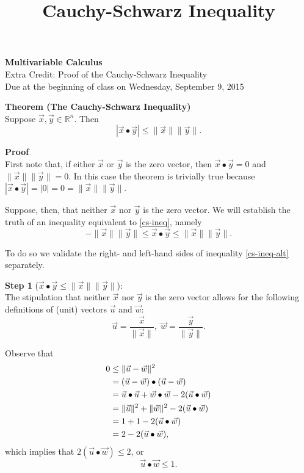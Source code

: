 \documentclass[11pt]{article}
\begin{document}
\title{Cauchy-Schwarz Inequality}

\thispagestyle{empty}

\begin{center}
{\LARGE \bf Multivariable Calculus}\\
{\large Extra Credit: Proof of the Cauchy-Schwarz Inequality}\\
Due at the beginning of class on Wednesday, September 9, 2015
\end{center}

\textbf{Theorem (The Cauchy-Schwarz Inequality)}\\
Suppose $\vec{x},\vec{y} \in \mathbb{R}^n$. Then 
\begin{equation}
|\vec{x} \bullet \vec{y}| \le \|\vec{x}\| \|\vec{y}\| \label{cs-ineq}.
\end{equation}

\textbf{Proof}\\
First note that, if either $\vec{x}$ or $\vec{y}$ is the zero vector, 
then $\vec{x} \bullet \vec{y} = 0$ and $\|\vec{x}\| \|\vec{y}\| = 0$. 
In this case the theorem is trivially true because 
$|\vec{x} \bullet \vec{y}| = |0| = 0 = \|\vec{x}\| \|\vec{y}\|$.

Suppose, then, that neither $\vec{x}$ nor $\vec{y}$ is the zero vector. 
We will establish the truth of an inequality equivalent to \eqref{cs-ineq}, 
namely
\begin{equation}
-\|\vec{x}\| \|\vec{y}\| \le \vec{x} \bullet \vec{y} \le 
\|\vec{x}\| \|\vec{y}\|. \label{cs-ineq-alt}
\end{equation}
  
To do so we validate the right- and left-hand sides of inequality 
\eqref{cs-ineq-alt} separately.

\textbf{Step 1} ($\vec{x} \bullet \vec{y} \le \|\vec{x}\| \|\vec{y}\|$):\\
The stipulation that neither $\vec{x}$ nor $\vec{y}$ is the zero vector 
allows for the following definitions of (unit) vectors $\vec{u}$ and $\vec{w}$:
\begin{equation}
\vec{u} = \frac{\vec{x}}{\|\vec{x}\|}, \; \vec{w} = 
\frac{\vec{y}}{\|\vec{y}\|}. \label{def1}
\end{equation}

Observe that
\begin{align}
0 & \le \|\vec{u}-\vec{w}\|^2 \notag\\
  & =(\vec{u}-\vec{w}) \bullet (\vec{u}-\vec{w}) \notag\\
  & = \vec{u} \bullet \vec{u} + \vec{w} \bullet \vec{w} - 2(\vec{u}\bullet\vec{w}) \notag\\
  & = \|\vec{u}\|^2 + \|\vec{w}\|^2 - 2(\vec{u} \bullet \vec{w}) \notag\\
  & = 1 + 1 - 2(\vec{u} \bullet \vec{w}) \notag\\
  & = 2 - 2(\vec{u} \bullet \vec{w}) \label{eq1},
\end{align}
which implies that $2(\vec{u} \bullet \vec{w}) \le 2$, or
\begin{equation}
  \vec{u} \bullet \vec{w} \le 1. \label{final}
\end{equation}
\end{document}
